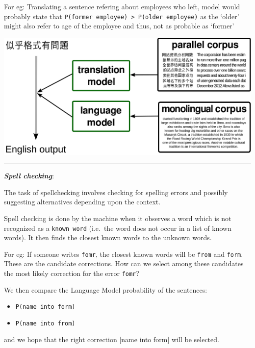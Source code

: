 \documentclass[11pt]{article}
\makeatletter
\def\maxwidth{\ifdim\Gin@nat@width>\linewidth\linewidth
    \else\Gin@nat@width\fi}
\let\Oldincludegraphics\includegraphics
\renewcommand{\includegraphics}[1]{\Oldincludegraphics[width=.8\maxwidth]{#1}}
\providecommand{\tightlist}{%
      \setlength{\itemsep}{0pt}\setlength{\parskip}{0pt}}
\makeatother
\begin{document}
For eg: Translating a sentence refering about employees who left, model
would probably state that
\texttt{P(former\ employee)\ \textgreater{}\ P(older\ employee)} as the
`older' might also refer to age of the employee and thus, not as
probable as `former'

\includegraphics{mt.png}

\begin{center}\rule{0.5\linewidth}{\linethickness}\end{center}

\textbf{\emph{Spell checking}}:

The task of spellchecking involves checking for spelling errors and
possibly suggesting alternatives depending upon the context.

Spell checking is done by the machine when it observes a word which is
not recognized as a \texttt{known\ word} (i.e.~the word does not occur
in a list of known words). It then finds the closest known words to the
unknown words.

For eg: If someone writes \texttt{fomr}, the closest known words will be
\texttt{from} and \texttt{form}. These are the candidate corrections.
How can we select among these candidates the most likely correction for
the error \texttt{fomr}?

We then compare the Language Model probability of the sentences:

\begin{itemize}
\tightlist
\item
  \texttt{P(name\ into\ form)}
\item
  \texttt{P(name\ into\ from)}
\end{itemize}

and we hope that the right correction {[}name into form{]} will be
selected.
\end{document}
